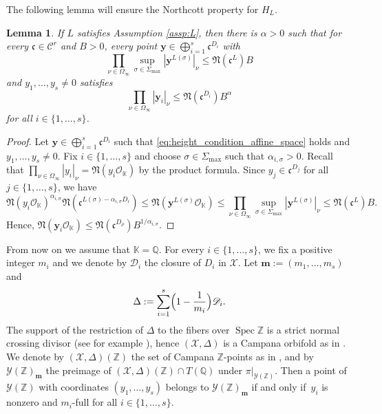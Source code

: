 \documentclass[JEP,XML,SOM,Unicode,published]{cedram}
\newcommand{\bfy}{\boldsymbol{y}}
\newcommand{\bfm}{{\boldsymbol{m}}}
\newcommand{\OO}{\mathcal{O}}
\newcommand\ZZ{\mathbb{Z}}
\newcommand\QQ{\mathbb{Q}}
\newcommand{\KK}{\mathbb{K}}
\newcommand{\idealnorm}{\mathfrak{N}}
\DeclareMathOperator{\spec}{Spec}
\newtheorem{lemma}[theorem]{Lemma}
\theoremstyle{definition}
\numberwithin{theorem}{section}
\begin{document}
The following lemma will ensure the Northcott property for $H_L$.

\begin{lemma}
\label{lem:northcott}
If $L$ satisfies Assumption \ref{assp:L},
then there is $\alpha>0$ such that for every
$\mathfrak c\in\mathcal C^r$ and $B>0$, every point
$ \bfy\in \bigoplus_{i=1}^s \mathfrak c^{D_i}$ with
\begin{equation}
\label{eq:height_condition_affine_space}
\prod_{\nu\in\Omega_\infty} \sup_{\sigma\in\Sigma_{\max}} | \bfy^{L(\sigma)}|_{\nu}
\leq \idealnorm(\mathfrak c^{L}) B
\end{equation}
and $y_1,\dots,y_s\neq0$ satisfies
\[
\prod_{\nu\in\Omega_\infty}| \bfy_i|_\nu\leq
\idealnorm(\mathfrak c^{D_{i}})B^\alpha
\]
for all $i\in\{1,\dots,s\}$.
\end{lemma}
\begin{proof}
Let $ \bfy\in \bigoplus_{i=1}^s \mathfrak c^{D_i}$
such that \eqref{eq:height_condition_affine_space} holds
and $y_1,\dots,y_s\neq0$.
Fix $i\in\{1,\dots,s\}$ and choose $\sigma\in \Sigma_{\max}$ such that
$\alpha_{i,\sigma}>0$.
Recall that $\prod_{\nu\in\Omega_\infty}|y_i |_\nu=\idealnorm(y_i \OO_{\KK})$
by the product formula.
Since $y_{j}\in\mathfrak c^{D_{j}}$
for all $j\in\{1,\dots,s\}$, we have
\[
\idealnorm(y_i\OO_{\KK})^{\alpha_{i,\sigma}}
\idealnorm(\mathfrak c^{L(\sigma)-\alpha_{i,\sigma}D_i})
\leq \idealnorm(\bfy^{L(\sigma)}\OO_{\KK})
\leq \prod_{\nu\in\Omega_\infty} \sup_{\sigma\in\Sigma_{\max}} | \bfy^{L(\sigma)} |_{\nu}
\leq \idealnorm(\mathfrak c^{L})B.
\]
Hence, $\idealnorm(\bfy_i\OO_{\KK})
\leq \idealnorm (\mathfrak c^{D_\rho})B^{1/\alpha_{i,\sigma}}$.
\end{proof}

\label{sec:campana}

From now on we assume that $\KK=\QQ$.
For every $i\in\{1,\dots,s\}$, we fix a positive integer $m_i$
and we denote by $\mathscr D_i$ the closure of $D_i$ in $\mathscr X$.
Let $\bfm:=(m_1,\dots,m_s)$ and
\[
\Delta:=\sum_{i=1}^s\Bigl(1-\frac 1{m_i}\Bigr) \mathscr D_i.
\]
The support of the restriction of $\Delta$ to the fibers over $\spec\ZZ$ is a strict
normal crossing divisor (see for example \cite[\S 5.1]{MR2740045}),
hence $(\mathscr{X},\Delta)$ is a Campana orbifold as in \cite[Def.\,3.1]{PSTVA}.
We denote by $(\mathscr{X},\Delta)(\ZZ)$ the set of Campana
$\mathbb Z$-points as in \cite[Def.\,3.4]{PSTVA}, and
by $\mathscr{Y}(\ZZ)_\bfm$ the preimage of
$(\mathscr{X},\Delta)(\ZZ)\cap T(\QQ)$ under $\pi|_{\mathscr{Y}(\ZZ)}$.
Then a point of $\mathscr{Y}(\ZZ)$ with coordinates
$(y_1,\dots,y_s)$ belongs to $\mathscr{Y}(\ZZ)_\bfm$
if and only if~$y_i$ is nonzero and $m_i$-full for all $i\in\{1,\dots,s\}$.
\end{document}
